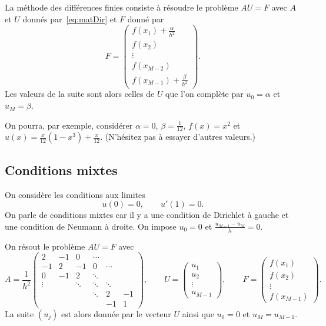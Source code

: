 \documentclass[12pt]{article}
\begin{document}
La m\'ethode des diff\'erences finies consiste \`a r\'esoudre le probl\`eme
$A U = F$ avec $A$ et $U$ donn\'es par~\eqref{eq:matDir} et $F$ donn\'e par
\begin{equation}
  \label{eq:F_Dir_non_hom}
  F = 
  \begin{pmatrix}
    f(x_1) + \frac{\alpha}{h^2}\\ f(x_2) \\ \vdots \\ f(x_{M-2}) \\ f(x_{M-1}) + \frac{\beta}{h^2}
  \end{pmatrix} .
\end{equation}
Les valeurs de la suite sont alors celles de $U$ que l'on compl\`ete par
$u_0 = \alpha$ et $u_M = \beta$.

On pourra, par exemple, consid\'erer
$\alpha = 0$, $\beta = \frac1{12}$, $f(x) = x^2$ et $u(x) = \frac{x}{12}(1-x^3) + \frac{x}{12}$.
(N'h\'esitez pas \`a essayer d'autres valeurs.)

\subsection{Conditions mixtes}
On consid\`ere les conditions aux limites
\begin{equation}
  \label{eq:mixte}
  u(0) = 0 , \qquad u'(1) = 0 .
\end{equation}
On parle de conditions mixtes car il y a une condition de Dirichlet \`a gauche
et une condition de Neumann \`a droite.
On impose $u_0 = 0$ et $\frac{u_{M-1} - u_{M}}{h} = 0$.

On r\'esout le probl\`eme $A U = F$ avec
\begin{equation}
  \label{eq:matMixte}
  A = \dfrac{1}{h^2} 
  \begin{pmatrix} 
    2 & -1 & 0 & \cdots
    \\
    -1 & 2 & -1 & 0 & \cdots
    \\
    0 & -1 & 2 & \ddots &
    \\
    \vdots & & \ddots & \ddots & \ddots
    \\
    & & &  \ddots & 2 & -1
    \\
    & &  & & -1 & 1
  \end{pmatrix} , \qquad U = 
  \begin{pmatrix}
    u_1 \\ u_2 \\ \vdots \\ u_{M-1}
  \end{pmatrix} , \qquad F = 
  \begin{pmatrix}
    f(x_1) \\ f(x_2) \\ \vdots \\ f(x_{M-1})
  \end{pmatrix} .
\end{equation}
La suite $(u_j)$ est alors donn\'ee par le vecteur $U$ ainsi que $u_0 = 0$
et $u_M = u_{M-1}$.
\end{document}
